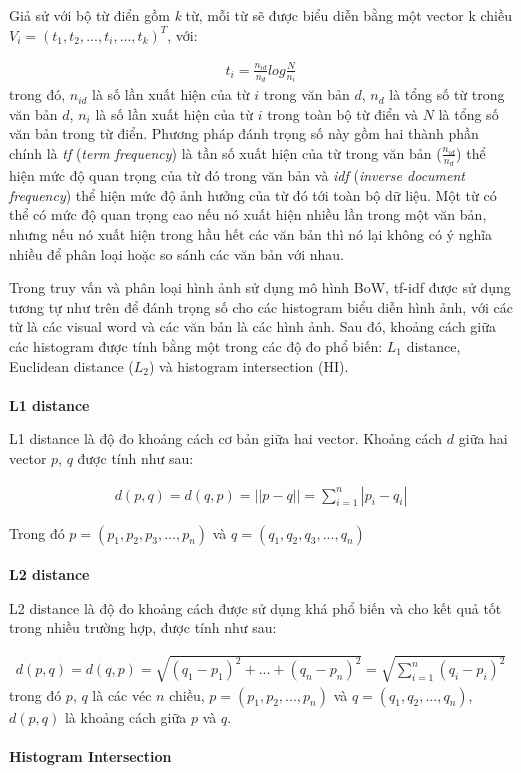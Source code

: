 Giả sử với bộ từ điển gồm \textit{k} từ, mỗi từ sẽ được biểu diễn bằng một vector k chiều $V_i = (t_1, t_2, ..., t_i, ..., t_k)^T$, với:

\begin{eqnarray}
t_i = \frac{n_{id}}{n_d}log\frac{N}{n_i}
\end{eqnarray}
trong đó, $n_{id}$ là số lần xuất hiện của từ $i$ trong văn bản $d$, $n_d$ là tổng số từ trong văn bản $d$, $n_i$ là số lần xuất hiện của từ $i$ trong toàn bộ từ điển và $N$ là tổng số văn bản trong từ điển. Phương pháp đánh trọng số này gồm hai thành phần chính là \textit{tf} (\textit{term frequency}) là tần số xuất hiện của từ trong văn bản ($\frac{n_{id}}{n_d}$) thể hiện mức độ quan trọng của từ đó trong văn bản và \textit{idf} (\textit{inverse document frequency}) thể hiện mức độ ảnh hưởng của từ đó tới toàn bộ dữ liệu. Một từ có thể có mức độ quan trọng cao nếu nó xuất hiện nhiều lần trong một văn bản, nhưng nếu nó xuất hiện trong hầu hết các văn bản thì nó lại không có ý nghĩa nhiều để phân loại hoặc so sánh các văn bản với nhau.

Trong truy vấn và phân loại hình ảnh sử dụng mô hình BoW, tf-idf được sử dụng tương tự như trên để đánh trọng số cho các histogram biểu diễn hình ảnh, với các từ là các visual word và các văn bản là các hình ảnh. Sau đó, khoảng cách giữa các histogram được tính bằng một trong các độ đo phổ biến: $L_1$ distance\cite{krauss1987taxicab}, Euclidean distance ($L_2$)\cite{deza2009encyclopedia} và histogram intersection (HI)\cite{cheng2010mammographic}.
\\
\\
\textbf{L1 distance}

L1 distance là độ đo khoảng cách cơ bản giữa hai vector. Khoảng cách $d$ giữa hai vector $p$, $q$ được tính như sau:

\begin{eqnarray}
d(p,q) = d(q,p) = ||p-q|| = \sum\limits_{i=1}^n |p_i - q_i|
\end{eqnarray}

Trong đó $p = (p_1, p_2, p_3, ..., p_n)$ và $q = (q_1, q_2, q_3, ..., q_n)$
\\
\\
\textbf{L2 distance}

L2 distance là độ đo khoảng cách được sử dụng khá phổ biến và cho kết quả tốt trong nhiều trường hợp, được tính như sau:

\begin{eqnarray}
d(p,q) = d(q,p) = \sqrt{(q_1-p_1)^2 + ... + (q_n-p_n)^2} = \sqrt{\sum\limits_{i=1}^n (q_i - p_i)^2}
\end{eqnarray}
trong đó $p$, $q$ là các véc $n$ chiều, $p = (p_1, p_2, ..., p_n)$ và $q = (q_1, q_2, ..., q_n)$, $d(p,q)$ là khoảng cách giữa $p$ và $q$.
\\
\\
\textbf{Histogram Intersection}

